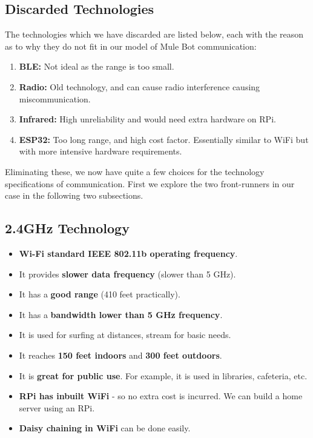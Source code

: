 \documentclass{article}
\begin{document}
\subsection{Discarded Technologies}
The technologies which we have discarded are listed below, each with the reason as to why they do not fit in our model of Mule Bot communication:
\begin{enumerate}
    \item \textbf{BLE:} Not ideal as the range is too small.
    \item \textbf{Radio:} Old technology, and can cause radio interference causing miscommunication.
    \item \textbf{Infrared:} High unreliability and would need extra hardware on RPi.
    \item \textbf{ESP32:} Too long range, and high cost factor. Essentially similar to WiFi but with more intensive hardware requirements. \cite{ESP32}
\end{enumerate}
Eliminating these, we now have quite a few choices for the technology specifications of communication. First we explore the two front-runners in our case in the following two subsections.
\subsection{2.4GHz Technology}
\begin{itemize}
\item \textbf{Wi-Fi standard IEEE 802.11b operating frequency}.
\item It provides \textbf{slower data frequency} (slower than 5 GHz).
\item It has a \textbf{good range} (410 feet practically).
\item It has a \textbf{bandwidth lower than 5 GHz frequency}.
\item It is used for surfing at distances, stream for basic needs.
\item It reaches \textbf{150 feet indoors} and \textbf{300 feet outdoors}.
\item It is \textbf{great for public use}. For example, it is used in libraries, cafeteria, etc.
\item \textbf{RPi has inbuilt WiFi} - so no extra cost is incurred. We can build a home server using an RPi.
\item \textbf{Daisy chaining in WiFi} can be done easily.
\end{itemize}
\end{document}

